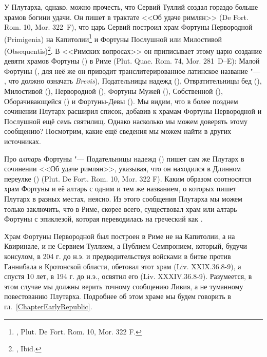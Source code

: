 У Плутарха, однако, можно прочесть, что Сервий Туллий создал гораздо больше храмов богини удачи\label{PlutarchosDeServio}. Он пишет в трактате <<Об удаче римлян>> (De Fort. Rom. 10, Mor. 322~F), что царь Сервий построил храм Фортуны Первородной (Primigenia) на Капитолии\footnote{, Plut. De Fort. Rom. 10, Mor. 322 F.} и Фортуны Послушной или Милостивой (Obsequentis)\footnote{, Ibid.}. В <<Римских вопросах>> он приписывает этому царю создание девяти храмов Фортуны () в Риме (Plut. Quae. Rom. 74, Mor. 281~D--E): Малой Фортуны (, для неё же он приводит транслитерированное латинское название "--- , что должно означать \textit{Brevis}), Подательницы надежд (), Отвратительницы бед (), Милостивой (), Первородной (), Фортуны Мужей (), Собственной (), Оборачивающейся () и Фортуны-Девы (). Мы видим, что в более позднем сочинении Плутарх расширил список, добавив к храмам Фортуны Первородной и Послушной ещё семь святилищ. Однако насколько мы можем доверять этому сообщению? Посмотрим, какие ещё сведения мы можем найти в других источниках.

Про \textit{алтарь} Фортуны "--- Подательницы надежд () пишет сам же Плутарх в сочинении <<Об удаче римлян>>, указывая, что он находился в Длинном переулке () (Plut. De Fort. Rom. 10, Mor. 322 F). Каким образом соотносятся храм Фортуны и её алтарь с одним и тем же названием, о которых пишет Плутарх в разных местах, неясно. Из этого сообщения Плутарха мы можем только заключить, что в Риме, скорее всего, существовал храм или алтарь Фортуны с эпиклезой, которая переводилась на греческий как .


Храм Фортуны Первородной был построен в Риме не на Капитолии, а на Квиринале, и не Сервием Туллием, а Публием Семпронием, который, будучи консулом, в 204 г. до н.э. и предводительствуя войсками в битве против Ганнибала в Кротонской области, обетовал этот храм (Liv. XXIX.36.8-9), а спустя 10 лет, в 194 г. до н.э., освятил его (Liv. XXXIV.36.8-9). Разумеется, в этом случае мы должны верить точному сообщению Ливия, а не туманному повестованию Плутарха. Подробнее об этом храме мы будем говорить в гл.~\ref{ChapterEarlyRepublic}.


